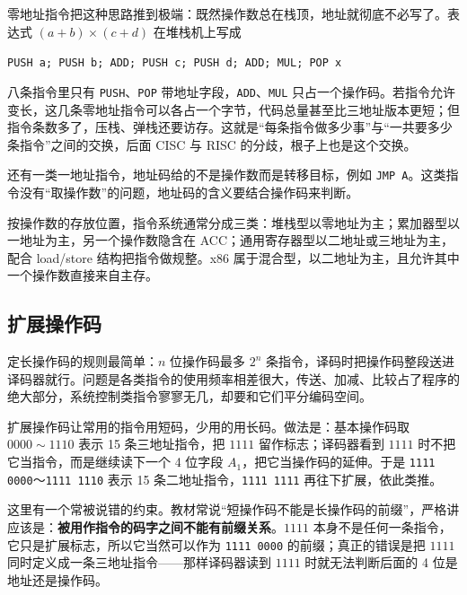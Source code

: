 零地址指令把这种思路推到极端：既然操作数总在栈顶，地址就彻底不必写了。表达式 \mbox{$(a+b)\times(c+d)$} 在堆栈机上写成

\begin{center}
\texttt{PUSH a; PUSH b; ADD; PUSH c; PUSH d; ADD; MUL; POP x}
\end{center}

八条指令里只有 \texttt{PUSH}、\texttt{POP} 带地址字段，\texttt{ADD}、\texttt{MUL} 只占一个操作码。若指令允许变长，这几条零地址指令可以各占一个字节，代码总量甚至比三地址版本更短；但指令条数多了，压栈、弹栈还要访存。这就是“每条指令做多少事”与“一共要多少条指令”之间的交换，后面 CISC 与 RISC 的分歧，根子上也是这个交换。

还有一类一地址指令，地址码给的不是操作数而是转移目标，例如 \texttt{JMP A}。这类指令没有“取操作数”的问题，地址码的含义要结合操作码来判断。

按操作数的存放位置，指令系统通常分成三类：堆栈型以零地址为主；累加器型以一地址为主，另一个操作数隐含在 ACC；通用寄存器型以二地址或三地址为主，配合 load/store 结构把指令做规整。x86 属于混合型，以二地址为主，且允许其中一个操作数直接来自主存。

\subsection{扩展操作码}

定长操作码的规则最简单：$n$ 位操作码最多 $2^n$ 条指令，译码时把操作码整段送进译码器就行。问题是各类指令的使用频率相差很大，传送、加减、比较占了程序的绝大部分，系统控制类指令寥寥无几，却要和它们平分编码空间。

扩展操作码让常用的指令用短码，少用的用长码。做法是：基本操作码取 $0000\sim1110$ 表示 15 条三地址指令，把 $1111$ 留作标志；译码器看到 $1111$ 时不把它当指令，而是继续读下一个 4 位字段 $A_1$，把它当操作码的延伸。于是 \texttt{1111 0000}～\texttt{1111 1110} 表示 15 条二地址指令，\texttt{1111 1111} 再往下扩展，依此类推。

这里有一个常被说错的约束。教材常说“短操作码不能是长操作码的前缀”，严格讲应该是：\textbf{被用作指令的码字之间不能有前缀关系}。$1111$ 本身不是任何一条指令，它只是扩展标志，所以它当然可以作为 \texttt{1111 0000} 的前缀；真正的错误是把 $1111$ 同时定义成一条三地址指令——那样译码器读到 $1111$ 时就无法判断后面的 4 位是地址还是操作码。

